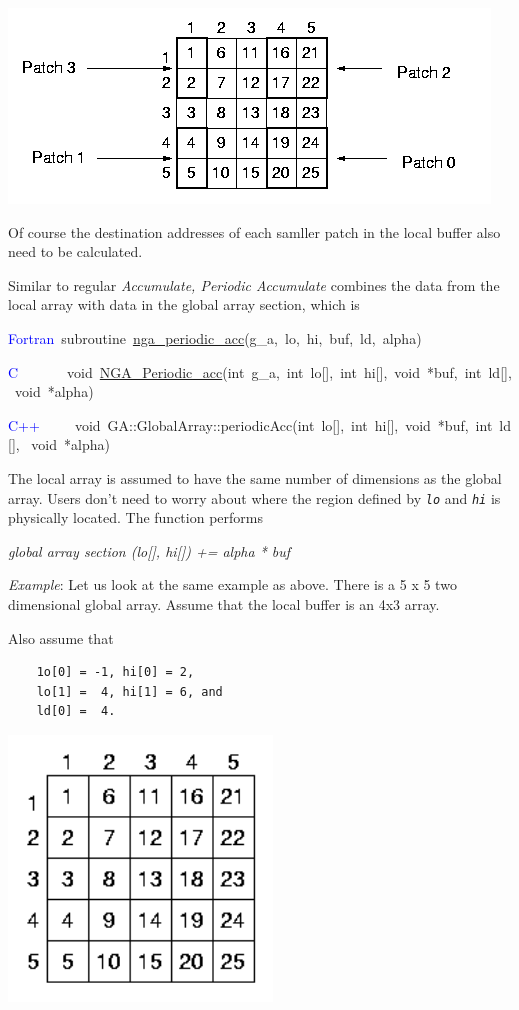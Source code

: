 \includegraphics[width=0.7\paperwidth]{periodic4}

Of course the destination addresses of each samller patch in the local
buffer also need to be calculated.

Similar to regular \emph{Accumulate, Periodic Accumulate} combines
the data from the local array with data in the global array section,
which is

\textcolor{blue}{Fortran}~subroutine~\href{https://hpc.pnl.gov/globalarrays/api/f_op_api.html\#ga_periodic_acc}{nga\_{}periodic\_{}acc}(g\_a,~lo,~hi,~buf,~ld,~alpha)~

\textcolor{blue}{C}~~~~~~~void~\href{https://hpc.pnl.gov/globalarrays/api/c_op_api.html\#ga_periodic_acc}{NGA\_{}Periodic\_{}acc}(int~g\_a,~int~lo{[}{]},~int~hi{[}{]},~void~{*}buf,~int~ld{[}{]},~void~{*}alpha)~

\textcolor{blue}{C++~}~~~~void~GA::GlobalArray::periodicAcc(int~lo{[}{]},~int~hi{[}{]},~void~{*}buf,~int~ld{[}{]},
~void~{*}alpha)

The local array is assumed to have the same number of dimensions as
the global array. Users don't need to worry about where the region
defined by \texttt{\emph{lo}} and \texttt{\emph{hi}} is physically
located. The function performs

\emph{global array section (lo{[}{]}, hi{[}{]}) += alpha {*} buf}

\emph{Example}: Let us look at the same example as above. There is
a 5 x 5 two dimensional global array. Assume that the local buffer
is an 4x3 array. 

Also assume that
\begin{verbatim}
    1o[0] = -1, hi[0] = 2,
    lo[1] =  4, hi[1] = 6, and
    ld[0] =  4.
\end{verbatim}
\includegraphics[width=7cm]{periodic1}

